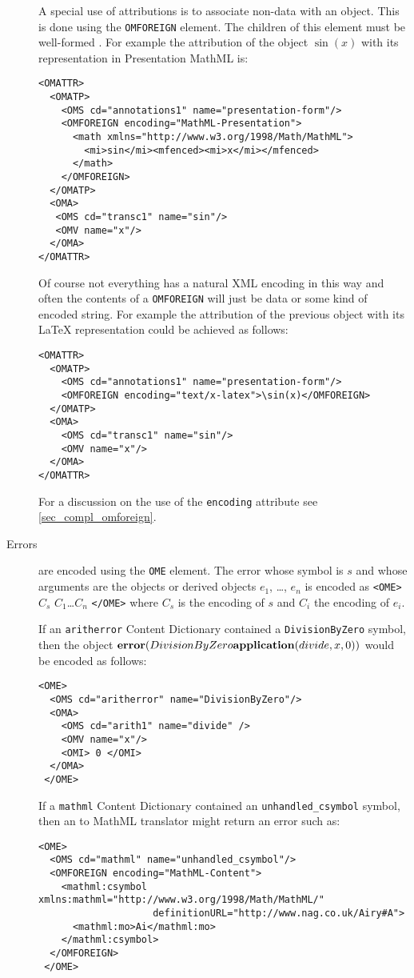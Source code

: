 \begin{description}
A special use of attributions is to associate non-\OM data with an \OM object.  This is
done using the \lstinline|OMFOREIGN| element.  The children of this element must be
well-formed \XML.  For example the attribution of the \OM object $\sin(x)$ with its
representation in Presentation MathML is:
\begin{lstlisting}
<OMATTR>
  <OMATP>
    <OMS cd="annotations1" name="presentation-form"/>  
    <OMFOREIGN encoding="MathML-Presentation">
      <math xmlns="http://www.w3.org/1998/Math/MathML">
        <mi>sin</mi><mfenced><mi>x</mi></mfenced>
      </math>
    </OMFOREIGN>  
  </OMATP>
  <OMA>
   <OMS cd="transc1" name="sin"/> 
   <OMV name="x"/>  
  </OMA>
</OMATTR>
\end{lstlisting}
Of course not everything has a natural XML encoding in this way and
often the contents of a \lstinline|OMFOREIGN| will just
be data or some kind of encoded string.  For example the attribution
of the previous object with its LaTeX representation could be achieved
as follows:
\begin{lstlisting}
<OMATTR>
  <OMATP>
    <OMS cd="annotations1" name="presentation-form"/>  
    <OMFOREIGN encoding="text/x-latex">\sin(x)</OMFOREIGN>  
  </OMATP>
  <OMA>
    <OMS cd="transc1" name="sin"/> 
    <OMV name="x"/>  
  </OMA>
</OMATTR>
\end{lstlisting}
For a discussion on the use of the \lstinline|encoding|
attribute see \ref{sec_compl_omforeign}.
\item[Errors] are encoded using the \lstinline|OME| element. The error whose symbol is $s$
  and whose arguments are the \OM objects or \OM derived objects $e_1$, \ldots, $e_n$ is
  encoded as \lstinline|<OME>| $C_s$ $C_1$\ldots $C_n$ \lstinline|</OME>| where $C_s$ is
  the encoding of $s$ and $C_i$ the encoding of $e_i$.

  If an \lstinline|aritherror| Content Dictionary contained a \lstinline|DivisionByZero|
  symbol, then the object
  $\mathbf{error}(DivisionByZero{\mathbf{application}(divide,x,0)})$ would be encoded as follows:

\begin{lstlisting}
<OME>
  <OMS cd="aritherror" name="DivisionByZero"/>  
  <OMA>
    <OMS cd="arith1" name="divide" />
    <OMV name="x"/>  
    <OMI> 0 </OMI>
  </OMA> 
 </OME>
\end{lstlisting}

  

If a \lstinline|mathml| Content Dictionary contained an
  \lstinline|unhandled_csymbol| symbol, then an \OM to
MathML translator might return an error such as:
\begin{lstlisting}
<OME>
  <OMS cd="mathml" name="unhandled_csymbol"/>  
  <OMFOREIGN encoding="MathML-Content">
    <mathml:csymbol xmlns:mathml="http://www.w3.org/1998/Math/MathML/"
                    definitionURL="http://www.nag.co.uk/Airy#A">
      <mathml:mo>Ai</mathml:mo>
    </mathml:csymbol>
  </OMFOREIGN> 
 </OME>
\end{lstlisting}



\end{description}

